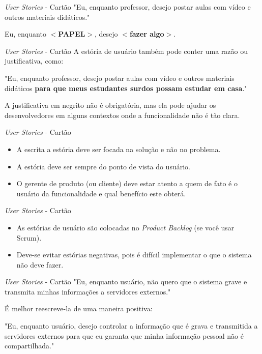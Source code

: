 \documentclass[11pt]{beamer}
\begin{document}
   \begin{frame}{\textit{User Stories} - Cartão}
      "Eu, enquanto professor, desejo postar aulas com vídeo e outros materiais didáticos."
\vspace{1cm}

      Eu, enquanto \textbf{$<$PAPEL$>$}, desejo \textbf{$<$fazer algo$>$}.
   \end{frame}

   \begin{frame}{\textit{User Stories} - Cartão}
      A estória de usuário também pode conter uma razão ou justificativa, como:
\vspace{1cm}
       
      "Eu, enquanto professor, desejo postar aulas com vídeo e outros materiais didáticos \textbf{para que meus estudantes surdos possam estudar em casa}."
\vspace{1cm}

      A justificativa em negrito não é obrigatória, mas ela pode ajudar os desenvolvedores em alguns contextos onde a funcionalidade não é tão clara.
   \end{frame}

   \begin{frame}{\textit{User Stories} - Cartão}
      \begin{itemize}
         \item A escrita a estória deve ser focada na solução e não no problema.
         \item A estória deve ser sempre do ponto de vista do usuário.
         \item O gerente de produto (ou cliente) deve estar atento a quem de fato é o usuário da funcionalidade e qual benefício este obterá.
      \end{itemize}
   \end{frame}

   \begin{frame}{\textit{User Stories} - Cartão}
      \begin{itemize}
         \item As estórias de usuário são colocadas no \textit{Product Backlog} (se você usar Scrum).
         \item Deve-se evitar estórias negativas, pois é difícil implementar o que o sistema não deve fazer.
      \end{itemize}
   \end{frame}

   \begin{frame}{\textit{User Stories} - Cartão}
       "Eu, enquanto usuário, não quero que o sistema grave e transmita minhas informações a servidores externos."
\vspace{1cm}
       
       É melhor reescreve-la de uma maneira positiva:
\vspace{.5cm}
       
       "Eu, enquanto usuário, desejo controlar a informação que é grava e transmitida a servidores externos para que eu garanta que minha informação pessoal não é compartilhada."
    \end{frame}
\end{document}

